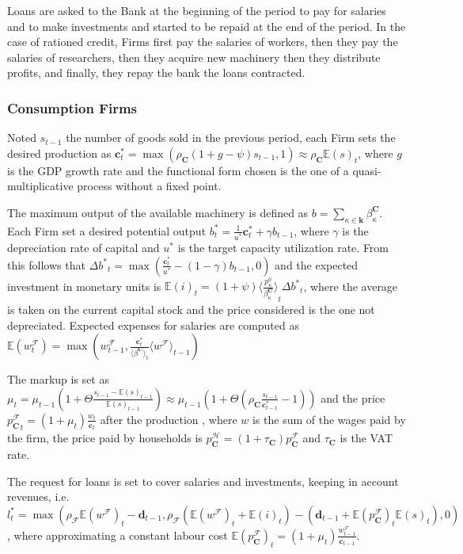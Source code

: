 \documentclass[a4paper, headings=standardclasses]{scrartcl}
\numberwithin{equation}{subsection}
\begin{document}
Loans are asked to the Bank at the beginning of the period to pay for salaries and to make investments and started to be repaid at the end of the period.
In the case of rationed credit, Firms first pay the salaries of workers, then they pay the salaries of researchers, then they acquire new machinery then they distribute profits, and finally, they repay the bank the loans contracted.

\subsubsection{Consumption Firms}
Noted $s_{t-1}$ the number of goods sold in the previous period, each Firm sets the desired production as $\mathbf{c}^*_t = \max(\rho_\mathbf{C}(1+g-\psi)s_{t-1},1) \approx \rho_\mathbf{C}\mathbb{E}(s)_{t}$, where $g$ is the GDP growth rate and the functional form chosen is the one of a quasi-multiplicative process without a fixed point.

The maximum output of the available machinery is defined as $b = \sum_{\kappa \in \mathbf{k}} \beta^{\mathbf{C}}_\kappa$. Each Firm set a desired potential output $b^*_t = \frac{1}{u^*}\mathbf{c}^*_t + \gamma b_{t-1}$, where $\gamma$ is the depreciation rate of capital and $u^*$ is the target capacity utilization rate. From this follows that ${\Delta b^*}_t = \max(\frac{\mathbf{c}^*_t}{u^*} - (1 - \gamma) b_{t-1}, 0)$ and the expected investment in monetary units is $\mathbb{E}(i)_t = (1+\psi){\langle\frac{{p^0_\kappa}}{\beta^\mathbf{C}_\kappa}\rangle}_{t}{\Delta b^*}_t$, where the average is taken on the current capital stock and the price considered is the one not depreciated. Expected expenses for salaries are computed as $\mathbb{E}(w^\mathcal{F}_t) = \max(w^\mathcal{F}_{t-1}, \frac{\mathbf{c}^*_t}{{\langle \beta^\mathbf{C} \rangle}_{t}}{\langle w^\mathcal{F} \rangle}_{t-1})$

The markup is set as $\mu_t = \mu_{t-1}(1 + \Theta \frac{s_{t-1}-{\mathbb{E}(s)}_{t-1}}{{\mathbb{E}(s)}_{t-1}}) \approx \mu_{t-1}(1+\Theta(\rho_\mathbf{C}\frac{s_{t-1}}{\mathbf{c}^*_{t-1}}-1))$ and the price ${p^{\mathcal{F}}_\mathbf{C}}_t = (1+\mu_t)\frac{w_t}{\mathbf{c}_t}$ after the production \parencite[like in][]{caiani2016}, where $w$ is the sum of the wages paid by the firm, the price paid by households is $p^\mathcal{H}_\mathbf{C} = (1+\tau_\mathbf{C})p^\mathcal{F}_\mathbf{C}$ and $\tau_\mathbf{C}$ is the VAT rate.

The request for loans is set to cover salaries and investments, keeping in account revenues, i.e. $l_t^* = \max(\rho_\mathcal{F} \mathbb{E}(w^\mathcal{F})_t - \mathbf{d}_{t-1}, \rho_\mathcal{F} (\mathbb{E}(w^\mathcal{F})_t + \mathbb{E}(i)_t) - (\mathbf{d}_{t-1} + {\mathbb{E}(p^\mathcal{F}_{\mathbf{C}})}_t {\mathbb{E}(s)}_t), 0)$, where approximating a constant labour cost ${\mathbb{E}(p^\mathcal{F}_\mathbf{C})}_t = (1+\mu_t)\frac{w^\mathcal{F}_{t-1}}{\mathbf{c}_{t-1}}$.
\end{document}
